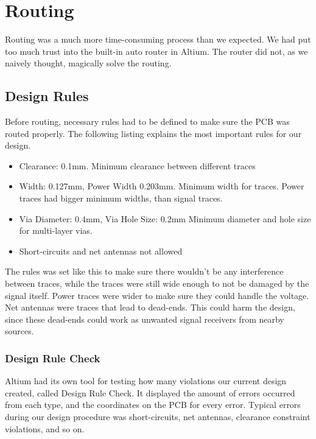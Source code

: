 \section{Routing}
Routing was a much more time-consuming process than we expected. We had put too much trust into the built-in auto router in Altium. The router did not, as we naively thought, magically solve the routing. 
\subsection{Design Rules}
Before routing, necessary rules had to be defined to make sure the PCB was routed properly. The following listing explains the most important rules for our design.
\begin{itemize}
\item Clearance: 0.1mm. 
\newline
Minimum clearance between different traces
\item Width: 0.127mm, Power Width 0.203mm.
\newline
Minimum width for traces. Power traces had bigger minimum widths, than signal traces.
\item Via Diameter: 0.4mm, Via Hole Size: 0.2mm
\newline
Minimum diameter and hole size for multi-layer vias.
\item Short-circuits and net antennas not allowed
\end{itemize}
The rules was set like this to make sure there wouldn't be any interference between traces, while the traces were still wide enough to not be damaged by the signal itself. Power traces were wider to make sure they could handle the voltage. 
\newline
Net antennas were traces that lead to dead-ends. This could harm the design, since these dead-ends could work as unwanted signal receivers from nearby sources.
\newline
\subsubsection{Design Rule Check}
Altium had its own tool for testing how many violations our current design created, called Design Rule Check. It displayed the amount of errors occurred from each type, and the coordinates on the PCB for every error. 
Typical errors during our design procedure was short-circuits, net antennas, clearance constraint violations, and so on.
